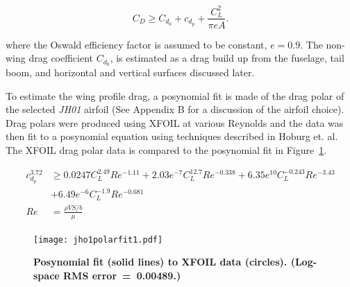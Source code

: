 \begin{equation}
    \label{e:aerodragb}
    C_D \geq C_{d_0} + c_{d_p} + \frac{C_L^2}{\pi e A}.
    \end{equation}

where the Oswald efficiency factor is assumed to be constant, $e=0.9$. 
The non-wing drag coefficient $C_{d_0}$, is estimated as a drag build up from the fuselage, tail boom, and horizontal and vertical surfaces discussed later.
    
    To estimate the wing profile drag, a posynomial fit is made of the drag polar of the selected \emph{JH01} airfoil (See Appendix B for a discussion of the airfoil choice). 
    Drag polars were produced using XFOIL\cite{xfoil} at various Reynolds and the data was then fit to a posynomial equation using techniques described in Hoburg et. al.\cite{fitting}
    The XFOIL drag polar data is compared to the posynomial fit in Figure~\ref{f:JH01polar}.

    \begin{align}
        \label{e:aerodragprof}
        c_{d_p}^{3.72} &\geq 0.0247C_L^{2.49}Re^{-1.11} + 2.03e^{-7}C_L^{12.7}Re^{-0.338} + 6.35e^{10}C_L^{-0.243}Re^{-3.43} \nonumber \\
                       &+ 6.49e^{-6}C_L^{-1.9}Re^{-0.681} \\
        Re &= \frac{\rho V S/b}{\mu}
    \end{align}

\begin{figure}[H]
	\begin{center}
	\texttt{[image: jho1polarfit1.pdf]}
    \caption{\textbf{Posynomial fit (solid lines) to XFOIL data (circles).  (Log-space RMS error~=~0.00489.)}}
	\label{f:JH01polar}
	\end{center}
\end{figure}

